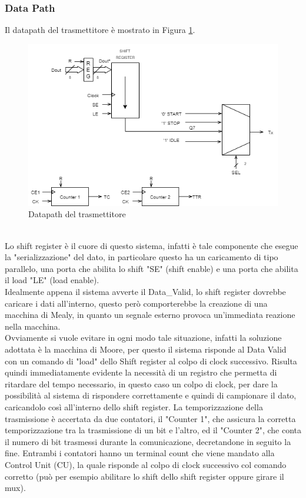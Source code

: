 \documentclass[a4paper, titlepage]{article}
\begin{document}
\subsubsection{Data Path}
Il datapath del trasmettitore è mostrato in Figura \ref{fig:dpath_TX}.
\begin{figure}[h]
\centering
\includegraphics[scale=0.8]{datapath_tx.png}
\caption{Datapath del trasmettitore}
\label{fig:dpath_TX}
\end{figure}
\\Lo shift register è il cuore di questo sistema, infatti è tale componente che esegue la "serializzazione" del dato, in particolare questo ha un caricamento di tipo parallelo, una porta che abilita lo shift "SE" (shift enable) e una porta che abilita il load "LE" (load enable).\\Idealmente appena il sistema avverte il Data\_Valid, lo shift register dovrebbe caricare i dati all'interno, questo però comporterebbe la creazione di una macchina di Mealy, in quanto un segnale esterno provoca un'immediata reazione nella macchina.\\Ovviamente si vuole evitare in ogni modo tale situazione, infatti la soluzione adottata è la macchina di Moore, per questo il sistema risponde al Data Valid con un comando di "load" dello Shift register al colpo di clock successivo. Risulta quindi immediatamente evidente la necessità di un registro che permetta di ritardare del tempo necessario, in questo caso un colpo di clock, per dare la possibilità al sistema di rispondere correttamente e quindi di campionare il dato, caricandolo così all'interno dello shift register. La temporizzazione della trasmissione è accertata da due contatori, il "Counter 1", che assicura la corretta temporizzazione tra la trasmissione di un bit e l'altro, ed il "Counter 2", che conta il numero di bit trasmessi durante la comunicazione, decretandone in seguito la fine. Entrambi i contatori hanno un terminal count che viene mandato alla Control Unit (CU), la quale risponde al colpo di clock successivo col comando corretto (può per esempio abilitare lo shift dello shift register oppure girare il mux).
\end{document}
